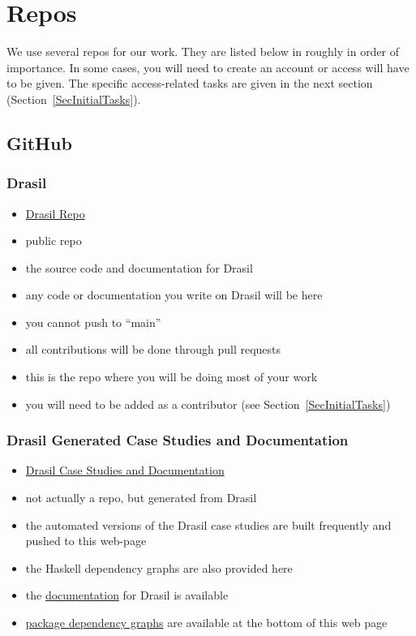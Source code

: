 \documentclass[12pt]{article}
\begin{document}
\section {Repos} \label{SecRepos}

We use several repos for our work.  They are listed below in roughly in order of
importance.  In some cases, you will need to create an account or access will
have to be given.  The specific access-related tasks are given in the next
section (Section~\ref{SecInitialTasks}).

\subsection{GitHub}

\subsubsection{Drasil}
\begin{itemize}
\item \href{https://github.com/JacquesCarette/Drasil} {Drasil Repo}
\item public repo
\item the source code and documentation for Drasil
\item any code or documentation you write on Drasil will be here
\item you cannot push to ``main''
\item all contributions will be done through pull requests
\item this is the repo where you will be doing most of your work
\item you will need to be added as a contributor (see Section~\ref{SecInitialTasks})
\end{itemize}

\subsubsection{Drasil Generated Case Studies and Documentation}
\begin{itemize}
\item \href{https://jacquescarette.github.io/Drasil/} {Drasil Case Studies and Documentation}
\item not actually a repo, but generated from Drasil
\item the automated versions of the Drasil case studies are built frequently and
pushed to this web-page
\item the Haskell dependency graphs are also provided here
\item the \href{https://jacquescarette.github.io/Drasil/docs/index.html}
{documentation} for Drasil is available
\item \href{https://jacquescarette.github.io/Drasil/} {package dependency
graphs} are available at the bottom of this web page
\end{itemize}
\end{document}
